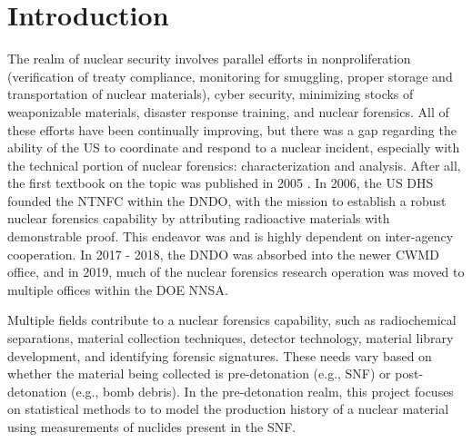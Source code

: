 
\glsresetall

\chapter{Introduction}
\label{ch:intro}

The realm of nuclear security involves parallel efforts in nonproliferation
(verification of treaty compliance, monitoring for smuggling, proper storage and
transportation of nuclear materials), cyber security, minimizing stocks of
weaponizable materials, disaster response training, and nuclear forensics. All
of these efforts have been continually improving, but there was  a gap regarding
the ability of the \gls{US} to coordinate and respond to a nuclear incident,
especially with the technical portion of nuclear forensics: characterization and
analysis. After all, the first textbook on the topic was published in 2005
\cite{nftext_2005}. In 2006, the \gls{US} \gls{DHS} founded the \gls{NTNFC}
within the \gls{DNDO}, with the mission to establish a robust nuclear forensics
capability by attributing radioactive materials with demonstrable proof. This
endeavor was and is highly dependent on inter-agency cooperation. In 2017 \--
2018, the \gls{DNDO} was absorbed into the newer \gls{CWMD} office, and in 2019,
much of the nuclear forensics research operation was moved to multiple offices
within the \gls{DOE} \gls{NNSA}. 

Multiple fields contribute to a nuclear forensics capability, such as
radiochemical separations, material collection techniques, detector technology,
material library development, and identifying forensic signatures. These needs
vary based on whether the material being collected is pre-detonation (e.g.,
\gls{SNF}) or post-detonation (e.g., bomb debris).  In the pre-detonation
realm, this project focuses on statistical methods to to model the production
history of a nuclear material using measurements of nuclides present in the
\gls{SNF}.

